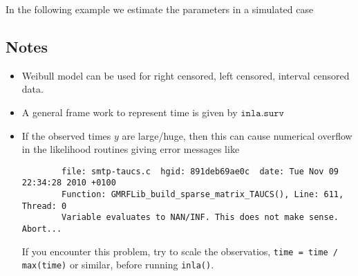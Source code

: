 \documentclass[a4paper,11pt]{article}
\begin{document}
In the following example we estimate the parameters in a simulated
case 

\subsection*{Notes}

\begin{itemize}
\item Weibull model can be used for right censored, left censored,
    interval censored data.
\item A general frame work to represent time is given by
    $\texttt{inla.surv}$
\item If the observed times $y$ are large/huge, then this can cause
    numerical overflow in the likelihood routines giving error
    messages like
\begin{verbatim}
        file: smtp-taucs.c  hgid: 891deb69ae0c  date: Tue Nov 09 22:34:28 2010 +0100
        Function: GMRFLib_build_sparse_matrix_TAUCS(), Line: 611, Thread: 0
        Variable evaluates to NAN/INF. This does not make sense. Abort...
\end{verbatim}
    If you encounter this problem, try to scale the observatios,
    \verb|time = time / max(time)| or similar, before running
    \verb|inla()|. 
\end{itemize}
\end{document}
